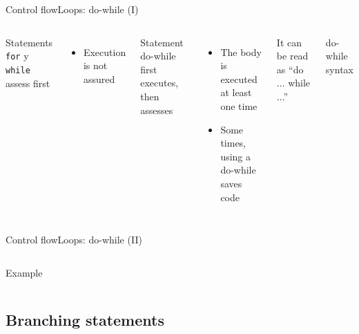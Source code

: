 \documentclass[10pt,compress]{beamer} %
\begin{document}
\begin{frame}{Control flow}{Loops: do-while (I)}
    \begin{columns}
		Statements \texttt{for} y \texttt{while} assess first
			\begin{itemize}
			\item Execution is not assured
			\end{itemize}
		Statement do-while first executes, then assesses
			\begin{itemize}
			\item The body is executed at least one time
			\item Some times, using a do-while saves code
			\end{itemize}
	    It can be read as ``do ... while ...''
		\begin{block}{do-while syntax}
		\vspace{-0.2cm}
		
		\vspace{-0.2cm}
		\end{block}
	\end{columns}
\end{frame}

\begin{frame}{Control flow}{Loops: do-while (II)}
	\begin{columns}
	\column{\textwidth}
	\begin{block}{Example}
		
	\end{block}
	\end{columns}
\end{frame}

\subsection[Branching statements]{Branching statements}
\end{document}
